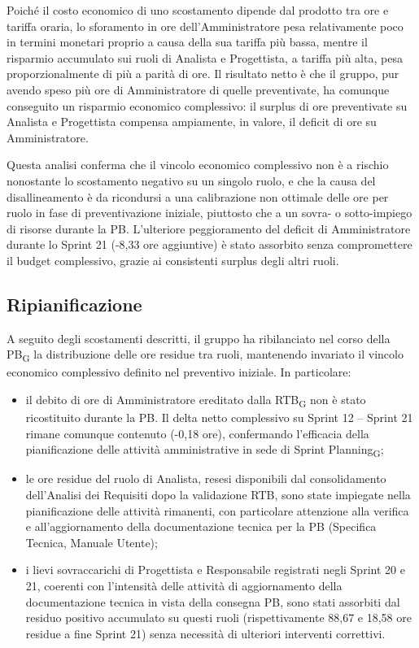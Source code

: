 Poiché il costo economico di uno scostamento dipende dal prodotto tra ore e
tariffa oraria, lo sforamento in ore dell'Amministratore pesa relativamente
poco in termini monetari proprio a causa della sua tariffa più bassa, mentre
il risparmio accumulato sui ruoli di Analista e Progettista, a tariffa più
alta, pesa proporzionalmente di più a parità di ore. Il risultato netto è
che il gruppo, pur avendo speso più ore di Amministratore di quelle
preventivate, ha comunque conseguito un risparmio economico complessivo:
il surplus di ore preventivate su Analista e Progettista compensa
ampiamente, in valore, il deficit di ore su Amministratore.

Questa analisi conferma che il vincolo economico complessivo non è a
rischio nonostante lo scostamento negativo su un singolo ruolo, e che la
causa del disallineamento è da ricondursi a una calibrazione non ottimale
delle ore per ruolo in fase di preventivazione iniziale, piuttosto che a un
sovra- o sotto-impiego di risorse durante la PB. L'ulteriore peggioramento
del deficit di Amministratore durante lo Sprint 21 (-8,33 ore aggiuntive)
è stato assorbito senza compromettere il budget complessivo, grazie ai
consistenti surplus degli altri ruoli.

\subsection{Ripianificazione}

A seguito degli scostamenti descritti, il gruppo ha ribilanciato nel corso
della PB\textsubscript{G} la distribuzione delle ore residue tra ruoli,
mantenendo invariato il vincolo economico complessivo definito nel preventivo
iniziale. In particolare:
\begin{itemize}
    \item il debito di ore di Amministratore ereditato dalla RTB\textsubscript{G}
    non è stato ricostituito durante la PB. Il delta netto complessivo su Sprint 12 -- Sprint 21
    rimane comunque contenuto (-0,18 ore), confermando l'efficacia della
    pianificazione delle attività amministrative in sede di Sprint
    Planning\textsubscript{G};
    \item le ore residue del ruolo di Analista, resesi disponibili dal
    consolidamento dell'Analisi dei Requisiti dopo la validazione RTB, sono
    state impiegate nella pianificazione delle attività rimanenti, con
    particolare attenzione alla verifica e all'aggiornamento della
    documentazione tecnica per la PB (Specifica Tecnica, Manuale Utente);
    \item i lievi sovraccarichi di Progettista e Responsabile registrati
    negli Sprint 20 e 21, coerenti con l'intensità delle attività di
    aggiornamento della documentazione tecnica in vista della consegna PB,
    sono stati assorbiti dal residuo positivo accumulato su questi ruoli
    (rispettivamente 88,67 e 18,58 ore residue a fine Sprint 21) senza
    necessità di ulteriori interventi correttivi.
\end{itemize}

